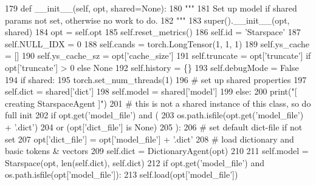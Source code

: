 \begin{DoxyCode}
179     \textcolor{keyword}{def }\_\_init\_\_(self, opt, shared=None):
180         \textcolor{stringliteral}{"""}
181 \textcolor{stringliteral}{        Set up model if shared params not set, otherwise no work to do.}
182 \textcolor{stringliteral}{        """}
183         super().\_\_init\_\_(opt, shared)
184         opt = self.opt
185         self.reset\_metrics()
186         self.id = \textcolor{stringliteral}{'Starspace'}
187         self.NULL\_IDX = 0
188         self.cands = torch.LongTensor(1, 1, 1)
189         self.ys\_cache = []
190         self.ys\_cache\_sz = opt[\textcolor{stringliteral}{'cache\_size'}]
191         self.truncate = opt[\textcolor{stringliteral}{'truncate'}] \textcolor{keywordflow}{if} opt[\textcolor{stringliteral}{'truncate'}] > 0 \textcolor{keywordflow}{else} \textcolor{keywordtype}{None}
192         self.history = \{\}
193         self.debugMode = \textcolor{keyword}{False}
194         \textcolor{keywordflow}{if} shared:
195             torch.set\_num\_threads(1)
196             \textcolor{comment}{# set up shared properties}
197             self.dict = shared[\textcolor{stringliteral}{'dict'}]
198             self.model = shared[\textcolor{stringliteral}{'model'}]
199         \textcolor{keywordflow}{else}:
200             print(\textcolor{stringliteral}{"[ creating StarspaceAgent ]"})
201             \textcolor{comment}{# this is not a shared instance of this class, so do full init}
202             \textcolor{keywordflow}{if} opt.get(\textcolor{stringliteral}{'model\_file'}) \textcolor{keywordflow}{and} (
203                 os.path.isfile(opt.get(\textcolor{stringliteral}{'model\_file'}) + \textcolor{stringliteral}{'.dict'})
204                 \textcolor{keywordflow}{or} (opt[\textcolor{stringliteral}{'dict\_file'}] \textcolor{keywordflow}{is} \textcolor{keywordtype}{None})
205             ):
206                 \textcolor{comment}{# set default dict-file if not set}
207                 opt[\textcolor{stringliteral}{'dict\_file'}] = opt[\textcolor{stringliteral}{'model\_file'}] + \textcolor{stringliteral}{'.dict'}
208             \textcolor{comment}{# load dictionary and basic tokens & vectors}
209             self.dict = DictionaryAgent(opt)
210 
211             self.model = Starspace(opt, len(self.dict), self.dict)
212             \textcolor{keywordflow}{if} opt.get(\textcolor{stringliteral}{'model\_file'}) \textcolor{keywordflow}{and} os.path.isfile(opt[\textcolor{stringliteral}{'model\_file'}]):
213                 self.load(opt[\textcolor{stringliteral}{'model\_file'}])

\end{DoxyCode}
